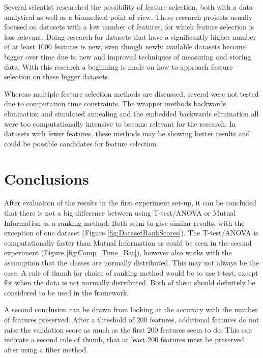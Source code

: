 \documentclass[10pt,a4paper]{article}
\begin{document}
	Several scientist researched the possibility of feature selection, both with a data analytical\cite{catal2009investigating} as well as a biomedical\cite{baumgartner2006data, welthagen2005comprehensive, liu2002comparative} point of view. These research projects usually focused on datasets with a low number of features, for which feature selection is less relevant. Doing research for datasets that have a significantly higher number of at least 1000 features is new, even though newly available datasets become bigger over time due to new and improved techniques of measuring and storing data. With this research a beginning is made on how to approach feature selection on these bigger datasets.
	
	Whereas multiple feature selection methods are discussed, several were not tested due to computation time constraints. The wrapper methods backwards elimination and simulated annealing and the embedded backwards elimination all were too computationally intensive to become relevant for the research. In datasets with fewer features, these methods may be showing better results and could be possible candidates for feature selection.
	
	
	\section{Conclusions}	
	\label{sec:Conclusions}
	
	After evaluation of the results in the first experiment set-up, it can be concluded that there is not a big difference between using T-test/ANOVA or Mutual Information as a ranking method. Both seem to give similar results, with the exception of one dataset (Figure \ref{fig:DatasetRankScores}). The T-test/ANOVA is computationally faster than Mutual Information as could be seen in the second experiment (Figure \ref{fig:Comp_Time_Bar}), however also works with the assumption that the classes are normally distributed. This may not always be the case. A rule of thumb for choice of ranking method would be to use t-test, except for when the data is not normally distributed. Both of them should definitely be considered to be used in the framework.
	
	A second conclusion can be drawn from looking at the accuracy with the number of features preserved. After a threshold of 200 features, additional features do not raise the validation score as much as the first 200 features seem to do. This can indicate a second rule of thumb, that at least 200 features must be preserved after using a filter method.
	
\end{document}

